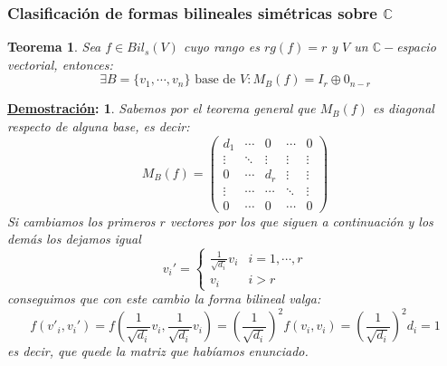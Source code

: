 \documentclass[10pt,a4paper,openright]{book}
\theoremstyle{break}
\newtheorem*{theo}{Teorema}
\newtheorem*{demo}{\underline{Demostración}:}
\begin{document}
\subsubsection{Clasificación de formas bilineales simétricas sobre $\mathbb C$}
\begin{theo}
Sea $f\in Bil_s(V)$ cuyo rango es $rg(f)= r$ y $V$ un $\mathbb C -$espacio vectorial, entonces:
$$\exists B =\{v_1, \cdots , v_n\}\mbox{ base de }V: M_B(f) = I_r\oplus 0_{n-r}$$
\end{theo}
\begin{demo}
Sabemos por el teorema general que $M_B(f)$ es diagonal respecto de alguna base, es decir:
$$M_B(f)=\begin{pmatrix} d_1 & \cdots & 0 & \cdots & 0 \\ \vdots & \ddots & \vdots & \vdots & \vdots \\ 0 & \cdots & d_r  & \vdots & \vdots \\ \vdots & \cdots & \cdots & \ddots & \vdots \\ 0 & \cdots & 0 & \cdots & 0\end{pmatrix}  $$
Si cambiamos los primeros $r$ vectores por los que siguen a continuación y los demás los dejamos igual
$$v_i' = \begin{cases} \frac{1}{\sqrt{d_i}}v_i & i = 1, \cdots , r \\ v_i& i > r\end{cases}$$
conseguimos que con este cambio la forma bilineal valga:
$$f(v'_i,v_i')=f\left(\frac{1}{\sqrt{d_i}}v_i, \frac{1}{\sqrt{d_i}}v_i\right) = \left(\frac{1}{\sqrt{d_i}}\right)^2f(v_i,v_i) = \left(\frac{1}{\sqrt{d_i}}\right)^2 d_i = 1 $$
es decir, que quede la matriz que habíamos enunciado.
\end{demo}
\end{document}
